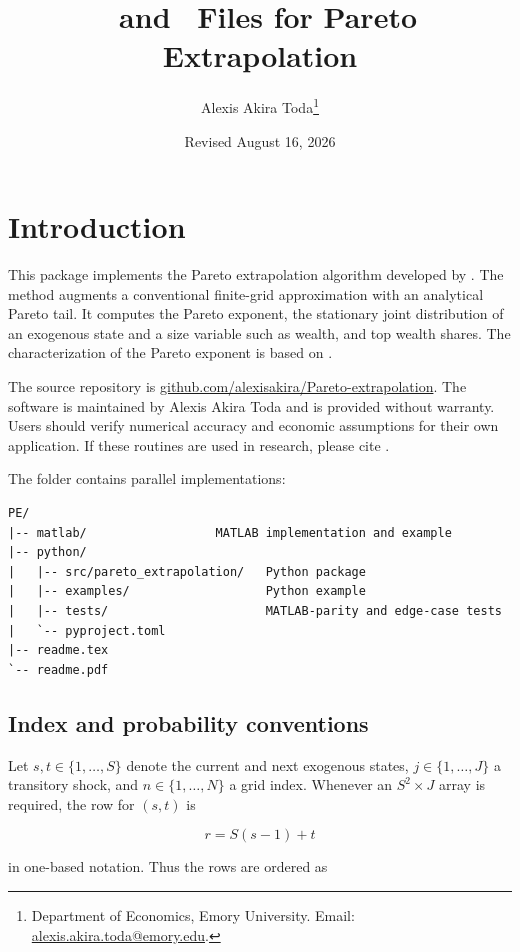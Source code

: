 \documentclass[a4paper,11pt]{article}
\title{\matlab\ and \python\ Files for Pareto Extrapolation}
\author{Alexis Akira Toda\thanks{Department of Economics, Emory University.
    Email: \href{mailto:alexis.akira.toda@emory.edu}{alexis.akira.toda@emory.edu}.}}
\date{Revised August 16, 2026}
\begin{document}
\maketitle

\section{Introduction}

This package implements the Pareto extrapolation algorithm developed by
\cite{GouinBonenfantToda2023}.  The method augments a conventional finite-grid
approximation with an analytical Pareto tail.  It computes the Pareto exponent,
the stationary joint distribution of an exogenous state and a size variable
such as wealth, and top wealth shares.  The characterization of the Pareto
exponent is based on \cite{BeareToda2022}.

The source repository is
\href{https://github.com/alexisakira/Pareto-extrapolation}{github.com/alexisakira/Pareto-extrapolation}.
The software is maintained by Alexis Akira Toda and is provided without
warranty.  Users should verify numerical accuracy and economic assumptions for
their own application.  If these routines are used in research, please cite
\cite{GouinBonenfantToda2023}.

The folder contains parallel implementations:

\begin{lstlisting}[style=code]
PE/
|-- matlab/                  MATLAB implementation and example
|-- python/
|   |-- src/pareto_extrapolation/   Python package
|   |-- examples/                   Python example
|   |-- tests/                      MATLAB-parity and edge-case tests
|   `-- pyproject.toml
|-- readme.tex
`-- readme.pdf
\end{lstlisting}

\subsection*{Index and probability conventions}

Let $s,t\in\{1,\ldots,S\}$ denote the current and next exogenous states,
$j\in\{1,\ldots,J\}$ a transitory shock, and $n\in\{1,\ldots,N\}$ a grid
index.  Whenever an $S^2\times J$ array is required, the row for $(s,t)$ is

\begin{equation*}
    r=S(s-1)+t
\end{equation*}

in one-based notation.  Thus the rows are ordered as
\end{document}
